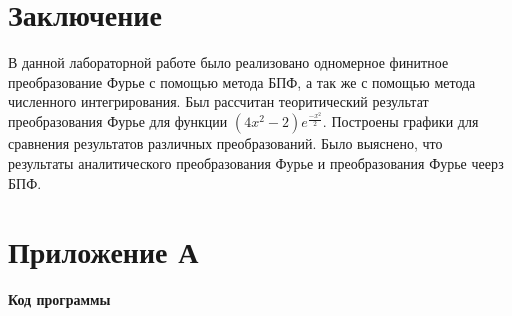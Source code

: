 \section*{Заключение}
{
	В данной лабораторной работе было реализовано одномерное финитное преобразование Фурье с помощью метода БПФ, а так же с помощью метода численного интегрирования. Был рассчитан теоритический результат преобразования Фурье для функции $(4 x^2 - 2) e^{\frac{-x^2}{2}}$. Построены графики для сравнения результатов различных преобразований. Было выяснено, что результаты аналитического преобразования Фурье и преобразования Фурье чеерз БПФ.
}
\newpage


\section*{Приложение А}
{
	\begin{center}
	\textbf{Код программы}
	\end{center}
	\inputminted[breaklines, mathescape, fontsize=\footnotesize]{octave}{./src/full.m}
}


